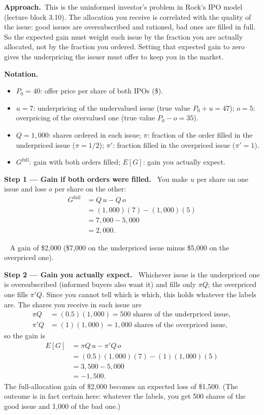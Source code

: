 \documentclass[11pt,a4paper]{article}
\newcommand{\notation}{\par\noindent\textbf{Notation.}}
\newcommand{\step}[2]{\par\medskip\noindent\textbf{Step #1 --- #2.}~}
\newcommand{\approach}{\par\smallskip\noindent\textbf{Approach.}~}
\newcommand{\answer}[1]{\par\smallskip\noindent\fbox{\textbf{Answer #1.}}~}
\begin{document}
\approach This is the uninformed investor's problem in Rock's IPO model (lecture block 3.10). The allocation you receive is correlated with the quality of the issue: good issues are oversubscribed and rationed, bad ones are filled in full. So the expected gain must weight each issue by the fraction you are actually allocated, not by the fraction you ordered. Setting that expected gain to zero gives the underpricing the issuer must offer to keep you in the market.

\notation
\begin{itemize}
  \item $P_0=40$: offer price per share of both IPOs (\$).
  \item $u=7$: underpricing of the undervalued issue (true value $P_0+u=47$); $o=5$: overpricing of the overvalued one (true value $P_0-o=35$).
  \item $Q=1{,}000$: shares ordered in each issue; $\pi$: fraction of the order filled in the underpriced issue ($\pi=1/2$); $\pi'$: fraction filled in the overpriced issue ($\pi'=1$).
  \item $G^{\text{full}}$: gain with both orders filled; $E[G]$: gain you actually expect.
\end{itemize}

\step{1}{Gain if both orders were filled} You make $u$ per share on one issue and lose $o$ per share on the other:
\begin{align}
  G^{\text{full}} &= Q\,u - Q\,o \label{t3e1-full}\\
                  &= (1{,}000)(7)-(1{,}000)(5) \nonumber\\
                  &= 7{,}000-5{,}000 \nonumber\\
                  &= 2{,}000. \nonumber
\end{align}

\answer{(a)} A gain of \$2{,}000 (\$7{,}000 on the underpriced issue minus \$5{,}000 on the overpriced one).

\step{2}{Gain you actually expect} Whichever issue is the underpriced one is oversubscribed (informed buyers also want it) and fills only $\pi Q$; the overpriced one fills $\pi' Q$. Since you cannot tell which is which, this holds whatever the labels are. The shares you receive in each issue are
\begin{align}
  \pi Q &= (0.5)(1{,}000) = 500 \text{ shares of the underpriced issue}, \nonumber\\
  \pi' Q &= (1)(1{,}000) = 1{,}000 \text{ shares of the overpriced issue}, \nonumber
\end{align}
so the gain is
\begin{align}
  E[G] &= \pi Q\,u - \pi' Q\,o \label{t3e1-exp}\\
       &= (0.5)(1{,}000)(7)-(1)(1{,}000)(5) \nonumber\\
       &= 3{,}500-5{,}000 \nonumber\\
       &= -1{,}500. \nonumber
\end{align}
The full-allocation gain of \$2{,}000 becomes an expected loss of \$1{,}500. (The outcome is in fact certain here: whatever the labels, you get 500 shares of the good issue and 1{,}000 of the bad one.)
\end{document}
